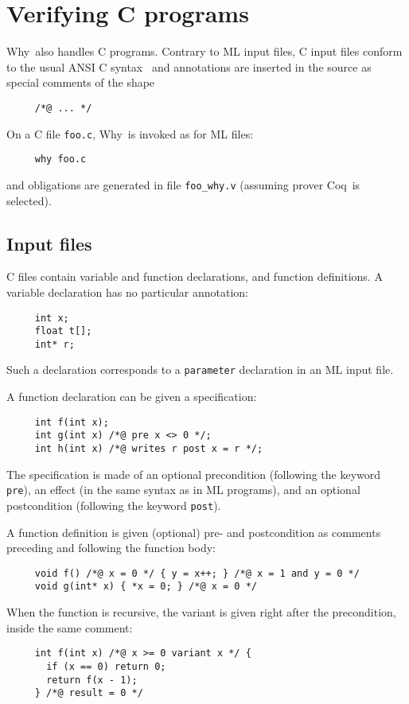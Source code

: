 \documentclass[a4paper,12pt]{report}
\makeatletter
\newcommand{\coq}{\textsf{Coq}\index{Coq@\textsf{Coq}}}
\newcommand{\why}{\textsf{Why}}
\makeatother
\begin{document}
\section{Verifying C programs}
\label{tutorial:C}

\why\ also handles C programs.
Contrary to ML input files, C input files conform to the usual ANSI C
syntax~\cite{KR88} and annotations are inserted in the source as
special comments of the shape 
\begin{verbatim}
     /*@ ... */
\end{verbatim}
On a C file \texttt{foo.c}, \why\ is invoked as for ML files:
\begin{verbatim}
     why foo.c
\end{verbatim}
and obligations are generated in file \texttt{foo\_why.v} (assuming prover
\coq\ is selected).

\subsection{Input files}

C files contain variable and function declarations, and function
definitions. 
A variable declaration has no particular annotation:
\begin{verbatim}
     int x;
     float t[];
     int* r;
\end{verbatim}
Such a declaration corresponds to a \texttt{parameter} declaration in
an ML input file.

A function declaration can be given a specification:
\begin{verbatim}
     int f(int x);
     int g(int x) /*@ pre x <> 0 */;
     int h(int x) /*@ writes r post x = r */;
\end{verbatim}
The specification is made of an optional precondition (following
the keyword \texttt{pre}), an effect (in the same syntax as in ML
programs), and an optional postcondition (following the keyword
\texttt{post}). 

A function definition is given (optional) pre- and postcondition as
comments preceding and following the function body:
\begin{verbatim}
     void f() /*@ x = 0 */ { y = x++; } /*@ x = 1 and y = 0 */
     void g(int* x) { *x = 0; } /*@ x = 0 */
\end{verbatim}
When the function is recursive, the variant is given right after the
precondition, inside the same comment:
\begin{verbatim}
     int f(int x) /*@ x >= 0 variant x */ {
       if (x == 0) return 0;
       return f(x - 1);
     } /*@ result = 0 */
\end{verbatim}
\end{document}
